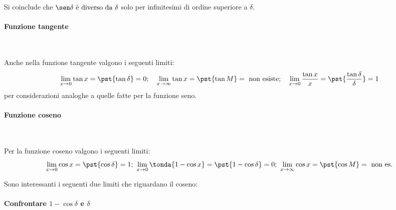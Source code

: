 Si coinclude che \(\sen \delta \text{ è diverso da } \delta\) solo per 
infinitesimi di ordine superiore a \(\delta\).

\paragraph{Funzione tangente}~

Anche nella funzione tangente valgono i seguenti limiti:
\[\lim_{x \rightarrow 0}{\tan x} = \pst{\tan \delta} = 0; \quad
\lim_{x \rightarrow \infty}{\tan x} = \pst{\tan M} = 
                                      \text{ non esiste}; \quad
\lim_{x \rightarrow 0}\frac{\tan x}{x} = \pst{\frac{\tan \delta}{\delta}} 
                                       = 1\]
per considerazioni analoghe a quelle fatte per la funzione seno.

\paragraph{Funzione coseno}~

Per la funzione coseno valgono i seguenti limiti:
\[\lim_{x \rightarrow 0}{\cos x} = \pst{\cos \delta} = 1; ~
\lim_{x \rightarrow 0}\tonda{1-\cos x} = \pst{1-\cos \delta} = 0; ~
\lim_{x \rightarrow \infty}{\cos x} = \pst{\cos M} = \text{ non es.}\]

Sono interessanti i seguenti due limiti che riguardano il coseno:
\paragraph{Confrontare \(1-\cos\delta\) e \(\delta\)}~
\label{senoverso1}

